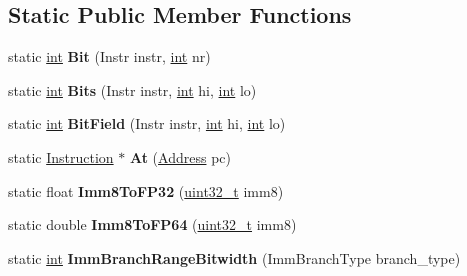 \subsection*{Static Public Member Functions}
\begin{DoxyCompactItemize}
\item 
\mbox{\label{classv8_1_1internal_1_1Instruction_a72f9d7a469c17eea228fe628530157e4}} 
static \mbox{\hyperlink{classint}{int}} {\bfseries Bit} (Instr instr, \mbox{\hyperlink{classint}{int}} nr)
\item 
\mbox{\label{classv8_1_1internal_1_1Instruction_af5577086b166e1c6f418c077ab935a9c}} 
static \mbox{\hyperlink{classint}{int}} {\bfseries Bits} (Instr instr, \mbox{\hyperlink{classint}{int}} hi, \mbox{\hyperlink{classint}{int}} lo)
\item 
\mbox{\label{classv8_1_1internal_1_1Instruction_a0f8fff80fb9aeeeb77172229c7d73d26}} 
static \mbox{\hyperlink{classint}{int}} {\bfseries Bit\+Field} (Instr instr, \mbox{\hyperlink{classint}{int}} hi, \mbox{\hyperlink{classint}{int}} lo)
\item 
\mbox{\label{classv8_1_1internal_1_1Instruction_adaf912e1f9fac18ea2f85be959e5157e}} 
static \mbox{\hyperlink{classv8_1_1internal_1_1Instruction}{Instruction}} $\ast$ {\bfseries At} (\mbox{\hyperlink{classuintptr__t}{Address}} pc)
\item 
\mbox{\label{classv8_1_1internal_1_1Instruction_a2d0626383234c3d89f65bd103395f290}} 
static float {\bfseries Imm8\+To\+F\+P32} (\mbox{\hyperlink{classuint32__t}{uint32\+\_\+t}} imm8)
\item 
\mbox{\label{classv8_1_1internal_1_1Instruction_ad5e027d142a7428c0ab4cc8523ed9f53}} 
static double {\bfseries Imm8\+To\+F\+P64} (\mbox{\hyperlink{classuint32__t}{uint32\+\_\+t}} imm8)
\item 
\mbox{\label{classv8_1_1internal_1_1Instruction_aceacb23d0cb19bfa603b1e8dec505aaa}} 
static \mbox{\hyperlink{classint}{int}} {\bfseries Imm\+Branch\+Range\+Bitwidth} (Imm\+Branch\+Type branch\+\_\+type)

\end{DoxyCompactItemize}
